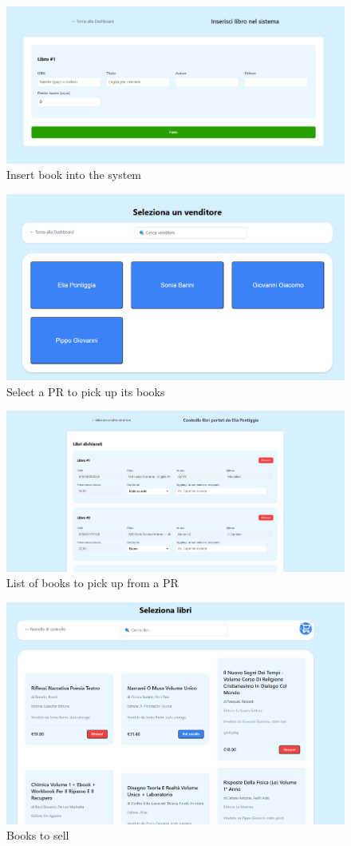 \begin{figure}[ht]
    \centering
    \includegraphics[width=.75\textwidth]{assets/ui_mockup/insert_book.png}
    \caption{Insert book into the system}
    \label{fig:insert_book}
\end{figure}

\begin{figure}[ht]
    \centering
    \includegraphics[width=.75\textwidth]{assets/ui_mockup/pickup_pr.png}
    \caption{Select a PR to pick up its books}
    \label{fig:pickup_pr}
\end{figure}

\begin{figure}[ht]
    \centering
    \includegraphics[width=.75\textwidth]{assets/ui_mockup/pickup_list.png}
    \caption{List of books to pick up from a PR}
    \label{fig:pickup_list}
\end{figure}

\begin{figure}[ht]
    \centering
    \includegraphics[width=.75\textwidth]{assets/ui_mockup/sellpage.png}
    \caption{Books to sell}
    \label{fig:sellpage}
\end{figure}

